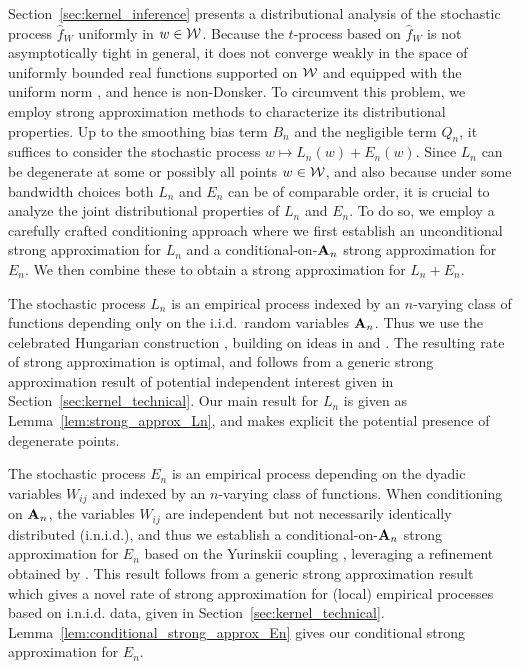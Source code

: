 Section~\ref{sec:kernel_inference} presents a distributional analysis of the
stochastic process $\hat{f}_W$ uniformly in $w \in \mathcal{W}$. Because the
$t$-process based on $\hat{f}_W$ is
not asymptotically tight in general, it does not converge weakly in the space
of uniformly bounded real functions supported on $\mathcal{W}$ and equipped with the
uniform norm \citep{van1996weak}, and hence is non-Donsker. To circumvent this
problem, we employ strong approximation methods to characterize its
distributional properties. Up to the smoothing bias term $B_n$ and the
negligible term $Q_n$, it suffices to consider the stochastic process
$w \mapsto L_n(w)+E_n(w)$. Since $L_n$ can be degenerate at some or possibly all
points $w\in\mathcal{W}$, and also because under some bandwidth choices both $L_n$ and
$E_n$ can be of comparable order, it is crucial to analyze the joint
distributional properties of $L_n$ and $E_n$. To do so, we employ a carefully
crafted conditioning approach where we first establish an unconditional strong
approximation for $L_n$ and a conditional-on-$\mathbf{A}_n$ strong approximation for
$E_n$. We then combine these to obtain a strong approximation for $L_n+E_n$.

The stochastic process $L_n$ is an empirical process indexed by an $n$-varying
class of functions depending only on the i.i.d.\ random variables $\mathbf{A}_n$. Thus
we use the celebrated Hungarian construction \citep{komlos1975approximation},
building on ideas in \citet{gine2004kernel} and \citet{gine2010confidence}. The
resulting rate of strong approximation is optimal, and follows from a generic
strong approximation result of potential independent interest given in
Section~\ref{sec:kernel_technical}. Our main result for $L_n$ is given as
Lemma~\ref{lem:strong_approx_Ln}, and makes explicit the potential presence of
degenerate points.

The stochastic process $E_n$ is an empirical process depending on the dyadic
variables $W_{i j}$ and indexed by an $n$-varying class of functions. When
conditioning on $\mathbf{A}_n$, the variables $W_{i j}$ are independent but not
necessarily identically distributed (i.n.i.d.), and thus we establish a
conditional-on-$\mathbf{A}_n$ strong approximation for $E_n$ based on the Yurinskii
coupling \citep{yurinskii1978error}, leveraging a refinement obtained by
\citet*[Lemma~38]{belloni2019conditional}. This result follows from a generic
strong approximation result which gives a novel rate of strong approximation
for (local) empirical processes based on i.n.i.d. data, given in
Section~\ref{sec:kernel_technical}.
Lemma~\ref{lem:conditional_strong_approx_En} gives our conditional strong
approximation for $E_n$.

